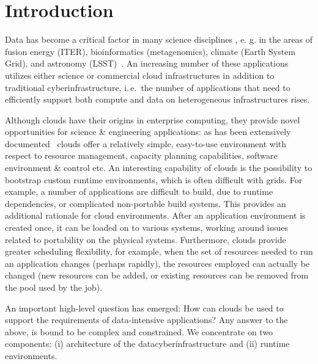 \documentclass[times]{cpeauth}
\begin{document}
\maketitle


\vspace{-6pt}

\section{Introduction}
\vspace{-2pt}

Data has become a critical factor in many science disciplines
\cite{fourthparadigm}, e. g. in the areas of fusion energy (ITER),
bioinformatics (metagenomics), climate (Earth System Grid), and
astronomy (LSST)~\cite{Jha:2011fk}. An increasing number of these
applications utilizes either science or commercial cloud
infrastructures in addition to traditional cyberinfrastructure,
i.\,e.\ the number of applications that need to efficiently support
both compute and data on heterogeneous infrastructures rises.


Although clouds have their origins in enterprise computing, they
provide novel opportunities for science \& engineering applications:
as has been extensively documented~\cite{Jha:2010kx} clouds offer a
relatively simple, easy-to-use environment with respect to resource
management, capacity planning capabilities, software environment \&
control etc.  An interesting capability of clouds is the possibility
to bootstrap custom runtime environments, which is often difficult
with grids. For example, a number of applications are difficult to
build, due to runtime dependencies, or complicated non-portable build
systems. This provides an additional rationale for cloud
environments. After an application environment is created once, it can
be loaded on to various systems, working around issues related to
portability on the physical systems. Furthermore, clouds provide
greater scheduling flexibility, for example, when the set of resources
needed to run an application changes (perhaps rapidly), the resources
employed can actually be changed (new resources can be added, or
existing resources can be removed from the pool used by the job).

An important high-level question has emerged: How can clouds be used
to support the requirements of data-intensive applications? Any answer
to the above, is bound to be complex and constrained.  We concentrate
on two components: (i) architecture of the datacyberinfrastructure and
(ii) runtime environments.
 
\end{document}
